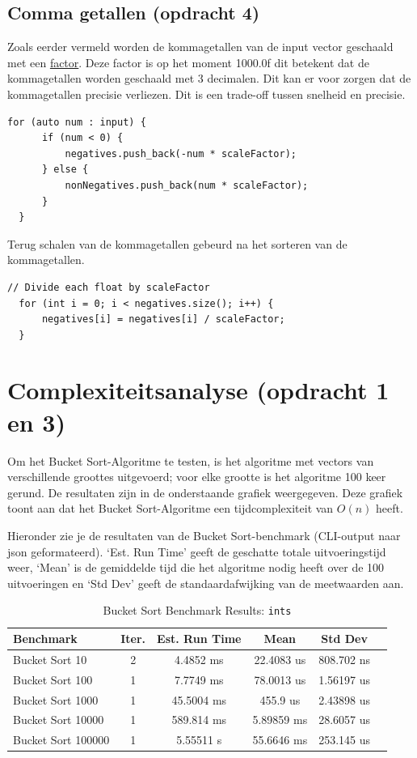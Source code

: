 \documentclass{article}
\begin{document}
\subsection{Comma getallen (opdracht 4)}
Zoals eerder vermeld worden de kommagetallen van de input vector geschaald met een \hyperref[lst:negatives]{factor}. 
Deze factor is op het moment 1000.0f dit betekent dat de kommagetallen worden geschaald met 3 decimalen.  
Dit kan er voor zorgen dat de kommagetallen precisie verliezen. Dit is een trade-off tussen snelheid en precisie.
\begin{lstlisting}[caption={Schaal factor}, label={lst:factor}]
  for (auto num : input) {
      if (num < 0) {
          negatives.push_back(-num * scaleFactor);
      } else {
          nonNegatives.push_back(num * scaleFactor);
      }
  }
\end{lstlisting}
Terug schalen van de kommagetallen gebeurd na het sorteren van de kommagetallen.
\begin{lstlisting}[caption={Terug schalen}, label={lst:factor}]
  // Divide each float by scaleFactor
  for (int i = 0; i < negatives.size(); i++) {
      negatives[i] = negatives[i] / scaleFactor;
  }
\end{lstlisting}


\newpage
\section{Complexiteitsanalyse (opdracht 1 en 3)}
Om het Bucket Sort-Algoritme te testen, is het algoritme met vectors van verschillende groottes uitgevoerd; voor elke grootte is het algoritme 100 keer gerund.  
De resultaten zijn in de onderstaande grafiek weergegeven. Deze grafiek toont aan dat het Bucket Sort-Algoritme een tijdcomplexiteit van \(O(n)\) heeft.

Hieronder zie je de resultaten van de Bucket Sort-benchmark (CLI-output naar json geformateerd). 
‘Est. Run Time’ geeft de geschatte totale uitvoeringstijd weer, 
‘Mean’ is de gemiddelde tijd die het algoritme nodig heeft over de 100 uitvoeringen en ‘Std Dev’ geeft de standaardafwijking van de meetwaarden aan.

\begin{table}[H]
  \caption{Bucket Sort Benchmark Results: \texttt{ints}\label{tab:ints-detailed}}
  \begin{tabular*}{\columnwidth}{@{\extracolsep\fill}lccccc}
    \hline
    Benchmark  & Iter. & Est. Run Time & Mean          & Std Dev       \\
    \hline
    Bucket Sort 10     & 2 & 4.4852 ms  & 22.4083 us  & 808.702 ns  \\
    Bucket Sort 100    & 1 & 7.7749 ms  & 78.0013 us  & 1.56197 us  \\
    Bucket Sort 1000   & 1 & 45.5004 ms & 455.9 us    & 2.43898 us  \\
    Bucket Sort 10000  & 1 & 589.814 ms & 5.89859 ms  & 28.6057 us  \\
    Bucket Sort 100000 & 1 & 5.55511 s  & 55.6646 ms  & 253.145 us  \\
    \hline
  \end{tabular*}
\end{table}
\end{document}
